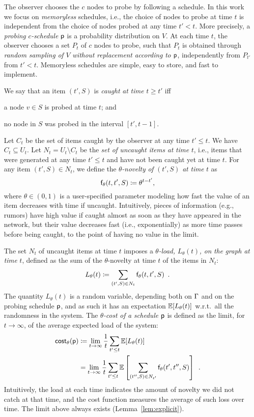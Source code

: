 The observer chooses the $c$ nodes to probe by following a schedule. In this work
we focus on \emph{memoryless} schedules, i.e., the choice of nodes to probe at
time $t$ is independent from the choice of nodes probed at any time $t'<t$.
More precisely, a \emph{probing $c$-schedule} $\mathsf{p}$ is a probability
distribution on $V$. At each time $t$, the observer chooses a set $P_t$ of $c$
nodes to probe, such that $P_t$ is obtained through \emph{random sampling of $V$
without replacement according to $\mathsf{p}$}, independently from $P_{t'}$ from
$t'< t$. Memoryless schedules are simple, easy to store, and fast to implement. 

We say that an item $(t',S)$ is \emph{caught at time $t\ge t'$} iff
\begin{enumerate*}
	\item a node $v\in S$ is probed at time $t$; and
	\item no node in $S$ was probed in the interval $[t',t-1]$.
\end{enumerate*}

Let $C_t$ be the set of items caught by the observer at any time $t'\le t$. We
have $C_t\subseteq U_t$. Let $N_t= U_t\setminus C_t$ be the \emph{set of
uncaught items at time $t$}, i.e., items that were generated at any time
$t'\le t$ and have not been caught yet at time $t$. For any item $(t',S)\in
N_t$, we define the \emph{$\theta$-novelty of $(t',S)$ at time $t$} as
\[
	\mathsf{f}_\theta(t,t',S)\coloneqq\theta^{t-t'},
\]
where $\theta\in(0,1)$ is a user-specified parameter modeling how fast the
value of an item decreases with time if uncaught. Intuitively, pieces of
information (e.g., rumors) have high value if caught almost as soon as they have
appeared in the network, but their value decreases fast (i.e., exponentially) as
more time passes before being caught, to the point of having no value in the
limit.

 The set $N_t$ of uncaught items
at time $t$ imposes a \emph{$\theta$-load, $L_\theta(t)$, on the graph at time
$t$}, defined as the sum of the $\theta$-novelty at time $t$ of the items in
$N_t$:
\[
	L_\theta(t)\coloneqq\sum_{(t',S)\in N_t} \mathsf{f}_\theta(t,t',S)\enspace.
\]
The quantity $L_\theta(t)$ is a random variable, depending both on $\Gamma$ and on
the probing schedule $\mathsf{p}$, and as such it has an expectation
$\mathbb{E}[L_\theta(t)]$ w.r.t.~all the randomness in the system. The
\emph{$\theta$-cost of a schedule $\mathsf{p}$} is defined as the limit, for
$t\rightarrow\infty$, of the average expected load of the system:
\begin{align*}
	\mathsf{cost}_\theta(\mathsf{p})&\coloneqq\lim_{t\rightarrow\infty}\frac{1}{t}\sum_{t'\le
	t}\mathbb{E}[L_\theta(t)]\\
	&=\lim_{t\rightarrow\infty}\frac{1}{t}\sum_{t'\le
	t}\mathbb{E}\left[\sum_{(t'',S)\in N_{t'}}\mathsf{f}_\theta(t',t'',S)\right]\enspace.
\end{align*}
Intuitively, the load at each time indicates the amount of novelty we did not
catch at that time, and the cost function measures the average of such loss over
time. The limit above always exists (Lemma~\ref{lem:explicit}).

